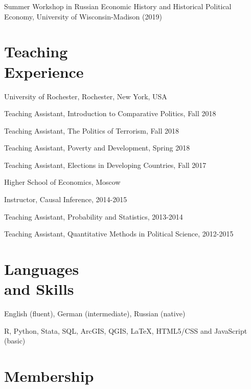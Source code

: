 \documentclass[margin,line,12pt]{res}
\newenvironment{list1}{
  \begin{list}{\ding{113}}{%
      \setlength{\itemsep}{0in}
      \setlength{\parsep}{0in} \setlength{\parskip}{0in}
      \setlength{\topsep}{0in} \setlength{\partopsep}{0in}
      \setlength{\leftmargin}{0.17in}}}{\end{list}}
\begin{document}
\begin{resume}
 \vspace*{-4.5mm} 
 Summer Workshop in Russian Economic History and Historical Political Economy, University of Wisconsin-Madison (2019)
 

\section{\sc Teaching \\ Experience}

{University of Rochester}, Rochester, New York, USA\\
\vspace*{-.1in}
\begin{list1}
\item[] Teaching Assistant, Introduction to Comparative Politics, Fall 2018
\item[] Teaching Assistant, The Politics of Terrorism, Fall 2018
\item[] Teaching Assistant, Poverty and Development, Spring 2018
\item[] Teaching Assistant, Elections in Developing Countries, Fall 2017 
\end{list1}

\vspace{-3mm}
{Higher School of Economics, Moscow}\\
\vspace*{-.1in}
\begin{list1}
	\item[] Instructor, Causal Inference, 2014-2015
	\item[] Teaching Assistant, Probability and Statistics, 2013-2014
	\item[] Teaching Assistant, Quantitative Methods in Political Science, 2012-2015
\end{list1}

\section{\sc Languages \\ and Skills}
English (fluent), German (intermediate), Russian (native)
\vspace*{-4.5mm}

R, Python, Stata, SQL, ArcGIS, QGIS, \LaTeX , HTML5/CSS and JavaScript (basic) 
\vspace*{-2.5mm}

\section{\sc Membership}


\end{resume}
\end{document}
